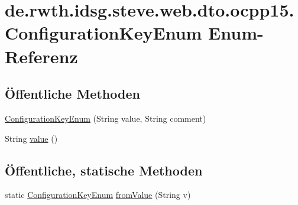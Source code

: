 \hypertarget{enumde_1_1rwth_1_1idsg_1_1steve_1_1web_1_1dto_1_1ocpp15_1_1_configuration_key_enum}{\section{de.\-rwth.\-idsg.\-steve.\-web.\-dto.\-ocpp15.\-Configuration\-Key\-Enum Enum-\/\-Referenz}
\label{enumde_1_1rwth_1_1idsg_1_1steve_1_1web_1_1dto_1_1ocpp15_1_1_configuration_key_enum}
}
\subsection*{Öffentliche Methoden}
\begin{DoxyCompactItemize}
\item 
\hyperlink{enumde_1_1rwth_1_1idsg_1_1steve_1_1web_1_1dto_1_1ocpp15_1_1_configuration_key_enum_a8ad03663602d21dbd077de28bd0e0c59}{Configuration\-Key\-Enum} (String value, String comment)
\item 
String \hyperlink{enumde_1_1rwth_1_1idsg_1_1steve_1_1web_1_1dto_1_1ocpp15_1_1_configuration_key_enum_a42f45495b41a42a7ee0a0b38c5e1f6ab}{value} ()
\end{DoxyCompactItemize}
\subsection*{Öffentliche, statische Methoden}
\begin{DoxyCompactItemize}
\item 
static \hyperlink{enumde_1_1rwth_1_1idsg_1_1steve_1_1web_1_1dto_1_1ocpp15_1_1_configuration_key_enum}{Configuration\-Key\-Enum} \hyperlink{enumde_1_1rwth_1_1idsg_1_1steve_1_1web_1_1dto_1_1ocpp15_1_1_configuration_key_enum_ad57b2424357800024fbaf32a4f8b0859}{from\-Value} (String v)
\end{DoxyCompactItemize}
